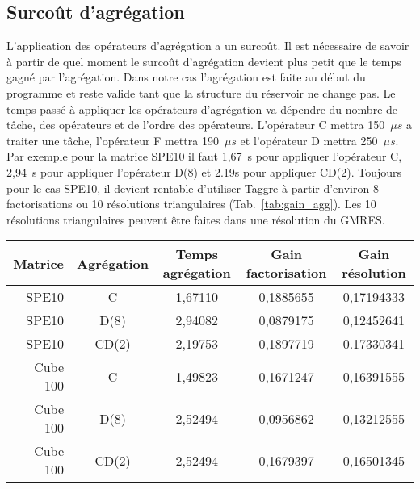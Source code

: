 \subsection{Surcoût d'agrégation}
L'application des opérateurs d'agrégation a un surcoût.
%
Il est nécessaire de savoir à partir de quel moment le surcoût d'agrégation devient plus petit que le temps gagné par l'agrégation.
%
Dans notre cas l'agrégation est faite au début du programme et reste valide tant que la structure du réservoir ne change pas.
%
Le temps passé à appliquer les opérateurs d'agrégation va dépendre du nombre de tâche, des opérateurs et de l'ordre des opérateurs.
%
L'opérateur C mettra 150~$\mu{s}$ a traiter une tâche, l'opérateur F mettra 190~$\mu{s}$ et l'opérateur D mettra 250~$\mu{s}$.
%
Par exemple pour la matrice SPE10 il faut 1,67~s pour appliquer l'opérateur C, 2,94~s pour appliquer l'opérateur D(8) et 2.19s pour appliquer CD(2).
%
Toujours pour le cas SPE10, il devient rentable d'utiliser Taggre à partir d'environ 8 factorisations ou 10 résolutions triangulaires (Tab.~\ref{tab:gain_agg}).
%
Les 10 résolutions triangulaires peuvent être faites dans une résolution du GMRES.

\begin{center}
  \begin{tabular}{ | r | c || c | c | c | }
    \hline
    Matrice & Agrégation & Temps agrégation & Gain factorisation & Gain résolution \\
    \hline
    \hline
    SPE10   &      C     & 1,67110          & 0,1885655          & 0,17194333 \\
    \hline
    SPE10   &    D(8)    & 2,94082          & 0,0879175          & 0,12452641 \\
    \hline
    SPE10   &    CD(2)   & 2,19753          & 0,1897719          & 0.17330341 \\
    \hline
    \hline
    Cube 100&      C     & 1,49823          & 0,1671247          & 0,16391555 \\
    \hline
    Cube 100&    D(8)    & 2,52494          & 0,0956862          & 0,13212555 \\
    \hline
    Cube 100&    CD(2)   & 2,52494          & 0,1679397          & 0,16501345 \\
    \hline
  \end{tabular}
  \label{tab:gain_agg}
\end{center}
